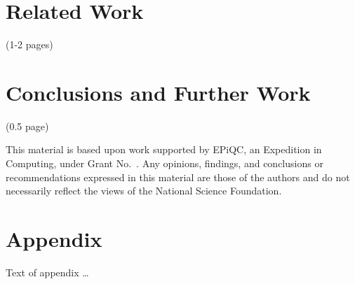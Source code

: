 \documentclass[acmsmall,review]{acmart}\settopmatter{printfolios=true,printccs=false,printacmref=false}
\begin{document}
\section{Related Work}
(1-2 pages)

\cite{huang2018}

\cite{huang2019}

\cite{nanevski2008}

\cite{paykin2018}

\cite{rand2018a}

\cite{ross2015algebraic}

\cite{ringer2019}

\cite{silq}

\section{Conclusions and Further Work}

(0.5 page)

\begin{acks}                            %
  This material is based upon work supported by
  EPiQC, an 
  Expedition in Computing, under Grant
  No.~.  Any opinions, findings, and
  conclusions or recommendations expressed in this material are those
  of the authors and do not necessarily reflect the views of the
  National Science Foundation.
\end{acks}




\appendix
\section{Appendix}

Text of appendix \ldots
\end{document}
